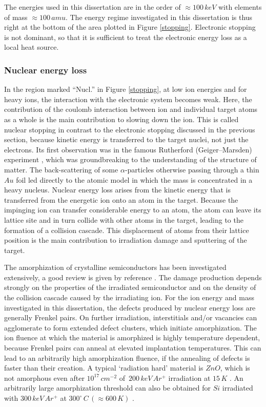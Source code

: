 The energies used in this dissertation are in the order of $\approx 100\,keV$ with elements of mass $\approx 100\,amu$. The energy regime investigated in this dissertation is thus right at the bottom of the area plotted in Figure \ref{stopping}. Electronic stopping is not dominant, so that it is sufficient to treat the electronic energy loss as a local heat source.

\subsubsection{Nuclear energy loss}

In the region marked ``Nucl.'' in Figure \ref{stopping}, at low ion energies and for heavy ions, the interaction with the electronic system becomes weak. Here, the contribution of the coulomb interaction between ion and individual target atoms as a whole is the main contribution to slowing down the ion. This is called nuclear stopping in contrast to the electronic stopping discussed in the previous section, because kinetic energy is transferred to the target nuclei, not just the electrons. Its first observation was in the famous Rutherford (Geiger–Marsden) experiment \cite{rutherford_scattering_1911}, which was groundbreaking to the understanding of the structure of matter. The back-scattering of some $\alpha$-particles otherwise passing through a thin $Au$ foil led directly to the atomic model in which the mass is concentrated in a heavy nucleus. Nuclear energy loss arises from the kinetic energy that is transferred from the energetic ion onto an atom in the target. Because the impinging ion can transfer considerable energy to an atom, the atom can leave its lattice site and in turn collide with other atoms in the target, leading to the formation of a collision cascade. This displacement of atoms from their lattice position is the main contribution to irradiation damage and sputtering of the target. 

The amorphization of crystalline semiconductors has been investigated extensively, a good review is given by reference \cite{wesch_damage_2012}. The damage production depends strongly on the properties of the irradiated semiconductor and on the density of the collision cascade caused by the irradiating ion. For the ion energy and mass investigated in this dissertation, the defects produced by nuclear energy loss are generally Frenkel pairs. On further irradiation, interstitials and/or vacancies can agglomerate to form extended defect clusters, which initiate amorphization. The ion fluence at which the material is amorphized is highly temperature dependent, because Frenkel pairs can anneal at elevated implantation temperatures. This can lead to an arbitrarily high amorphization fluence, if the annealing of defects is faster than their creation. A typical `radiation hard' material is $ZnO$, which is not amorphous even after $10^{17}\,cm^{-2}$ of $\,200\,keV\,Ar^+$ irradiation at $15\,K$ \cite{wesch_damage_2012}. An arbitrarily large amorphization threshold can also be obtained for $Si$ irradiated with $300\,keV\,Ar^+$ at $300^\circ\,C\,(\approx 600\,K)$ \cite{pelaz_ion-beam-induced_2004}.

